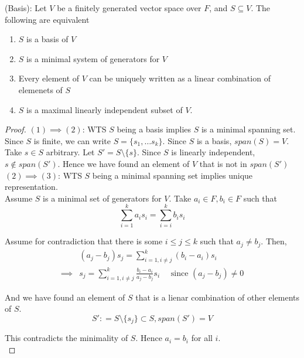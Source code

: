 \begin{theorem}
(Basis): Let $V$ be a finitely generated vector space over $F$, and $S \subseteq V$. The following are equivalent 
    \begin{enumerate}
        \item $S$ is a basis of $V$
        \item $S$ is a minimal system of generators for $V$
        \item Every element of $V$ can be uniquely written as a linear combination of elemenets of $S$
        \item $S$ is a maximal linearly independent subset of $V$.
    \end{enumerate}
\end{theorem} 

\begin{proof}
$(1) \implies (2)$: WTS $S$ being a basis implies $S$ is a minimal spanning set. \\

Since $S$ is finite, we can write $S = \{ s_1, \hdots s_k \} $. Since $S$ is a basis, $span(S) = V$. Take $s \in S$ arbitrary. Let $S' = S \setminus \{ s \}$. Since $S$ is linearly independent, $s \notin span(S')$. Hence we have found an element of $V$   that is not in $span(S')$ \\

$(2) \implies (3)$:  WTS $S$ being a minimal spanning set implies unique representation. \\

Assume $S$ is a minimal set of generators for $V$. Take $a_i \in F, b_i \in F$ such that 
\[
  \sum\limits_{i = 1}^{k}  a_i s_i = \sum\limits_{i = i}^{k} b_i s_i
\]

Assume for contradiction that there is some $i \leq j \leq k$ such that $a_j \neq b_j$. Then,
\begin{align*}
    &(a_j - b_j) s_j = \sum\limits_{i = 1, i \neq j}^{k} (b_i - a_i) s_i \\
    \implies & s_j = \sum\limits_{i = 1, i \neq j}^{k} \frac{b_i - a_i}{a_j - b_j} s_i \quad \text{ since } (a_j - b_j) \neq 0
\end{align*}

And we have found an element of $S$ that is a lienar combination of other elements of $S$. 
\[
  S' : = S \setminus \{ s_j \}  \subset S, span(S') = V
\]

This contradicts the minimality of $S$. Hence $a_i = b_i$ for all $i$. \\


\end{proof}
